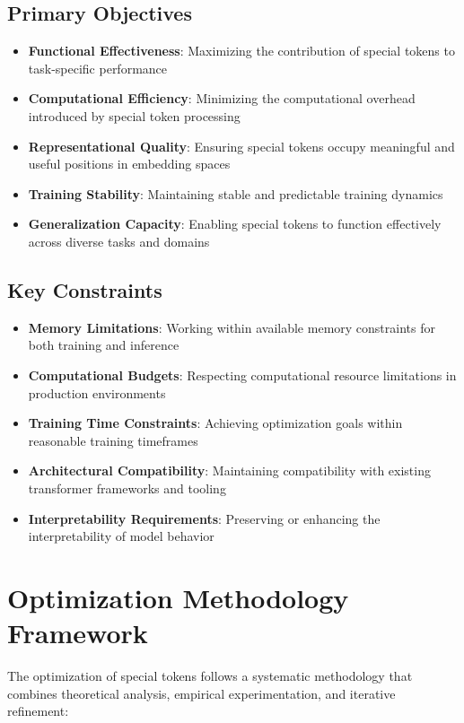 \subsection{Primary Objectives}

\begin{itemize}
\item \textbf{Functional Effectiveness}: Maximizing the contribution of special tokens to task-specific performance
\item \textbf{Computational Efficiency}: Minimizing the computational overhead introduced by special token processing
\item \textbf{Representational Quality}: Ensuring special tokens occupy meaningful and useful positions in embedding spaces
\item \textbf{Training Stability}: Maintaining stable and predictable training dynamics
\item \textbf{Generalization Capacity}: Enabling special tokens to function effectively across diverse tasks and domains
\end{itemize}

\subsection{Key Constraints}

\begin{itemize}
\item \textbf{Memory Limitations}: Working within available memory constraints for both training and inference
\item \textbf{Computational Budgets}: Respecting computational resource limitations in production environments
\item \textbf{Training Time Constraints}: Achieving optimization goals within reasonable training timeframes
\item \textbf{Architectural Compatibility}: Maintaining compatibility with existing transformer frameworks and tooling
\item \textbf{Interpretability Requirements}: Preserving or enhancing the interpretability of model behavior
\end{itemize}

\section{Optimization Methodology Framework}

The optimization of special tokens follows a systematic methodology that combines theoretical analysis, empirical experimentation, and iterative refinement:

